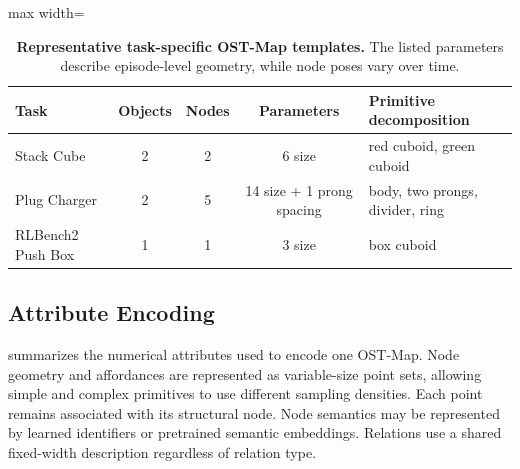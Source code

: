 \begin{table}[t]
    \centering
    \caption{\textbf{Representative task-specific OST-Map templates.}
    The listed parameters describe episode-level geometry, while node poses
    vary over time.}
    \label{tab:ost_map_templates}
    \vspace{2pt}
    \small
    \setlength{\tabcolsep}{4pt}
    \begin{adjustbox}{max width=\columnwidth}
    \begin{tabular}{lcccl}
        \toprule
        Task & Objects & Nodes & Parameters & Primitive decomposition \\
        \midrule
        Stack Cube & 2 & 2 & 6 size
        & red cuboid, green cuboid \\
        Plug Charger & 2 & 5 & 14 size + 1 prong spacing
        & body, two prongs, divider, ring \\
        RLBench2 Push Box & 1 & 1 & 3 size
        & box cuboid \\
        \bottomrule
    \end{tabular}
    \end{adjustbox}
\end{table}

\subsection{Attribute Encoding}
\label{app:ost_map_attribute_encoding}

 summarizes the numerical attributes used to
encode one OST-Map. Node geometry and affordances are represented as
variable-size point sets, allowing simple and complex primitives to use
different sampling densities. Each point remains associated with its
structural node. Node semantics may be represented by learned identifiers or
pretrained semantic embeddings. Relations use a shared fixed-width
description regardless of relation type.

